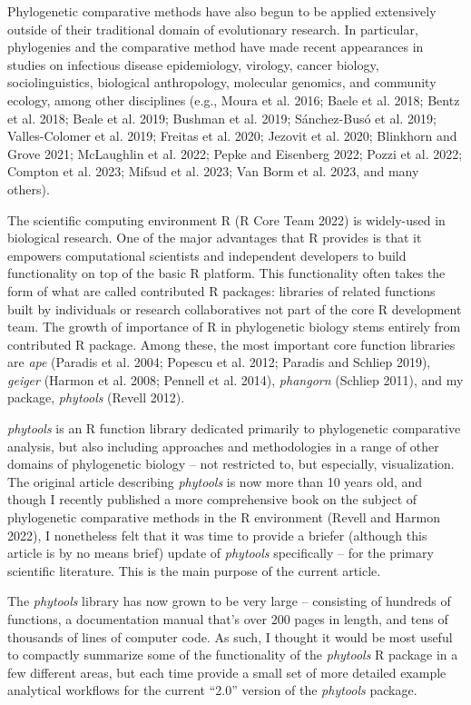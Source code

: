 \documentclass[fleqn,10pt,lineno]{wlpeerj} %
\begin{document}
Phylogenetic comparative methods have also begun to be applied extensively outside of their traditional domain of evolutionary research. In particular, phylogenies and the comparative method have made recent appearances in studies on infectious disease epidemiology, virology, cancer biology, sociolinguistics, biological anthropology, molecular genomics, and community ecology, among other disciplines (e.g., Moura et al. 2016; Baele et al. 2018; Bentz et al. 2018; Beale et al. 2019; Bushman et al. 2019; Sánchez-Busó et al. 2019; Valles-Colomer et al. 2019; Freitas et al. 2020; Jezovit et al. 2020; Blinkhorn and Grove 2021; McLaughlin et al. 2022; Pepke and Eisenberg 2022; Pozzi et al. 2022; Compton et al. 2023; Mifsud et al. 2023; Van Borm et al. 2023, and many others).

The scientific computing environment R (R Core Team 2022) is widely-used in biological research. One of the major advantages that R provides is that it empowers computational scientists and independent developers to build functionality on top of the basic R platform. This functionality often takes the form of what are called contributed R packages: libraries of related functions built by individuals or research collaboratives not part of the core R development team. The growth of importance of R in phylogenetic biology stems entirely from contributed R package. Among these, the most important core function libraries are \emph{ape} (Paradis et al. 2004; Popescu et al. 2012; Paradis and Schliep 2019), \emph{geiger} (Harmon et al. 2008; Pennell et al. 2014), \emph{phangorn} (Schliep 2011), and my package, \emph{phytools} (Revell 2012).

\emph{phytools} is an R function library dedicated primarily to phylogenetic comparative analysis, but also including approaches and methodologies in a range of other domains of phylogenetic biology -- not restricted to, but especially, visualization. The original article describing \emph{phytools} is now more than 10 years old, and though I recently published a more comprehensive book on the subject of phylogenetic comparative methods in the R environment (Revell and Harmon 2022), I nonetheless felt that it was time to provide a briefer (although this article is by no means brief) update of \emph{phytools} specifically -- for the primary scientific literature. This is the main purpose of the current article.

The \emph{phytools} library has now grown to be very large -- consisting of hundreds of functions, a documentation manual that's over 200 pages in length, and tens of thousands of lines of computer code. As such, I thought it would be most useful to compactly summarize some of the functionality of the \emph{phytools} R package in a few different areas, but each time provide a small set of more detailed example analytical workflows for the current ``2.0'' version of the \emph{phytools} package.
\end{document}
